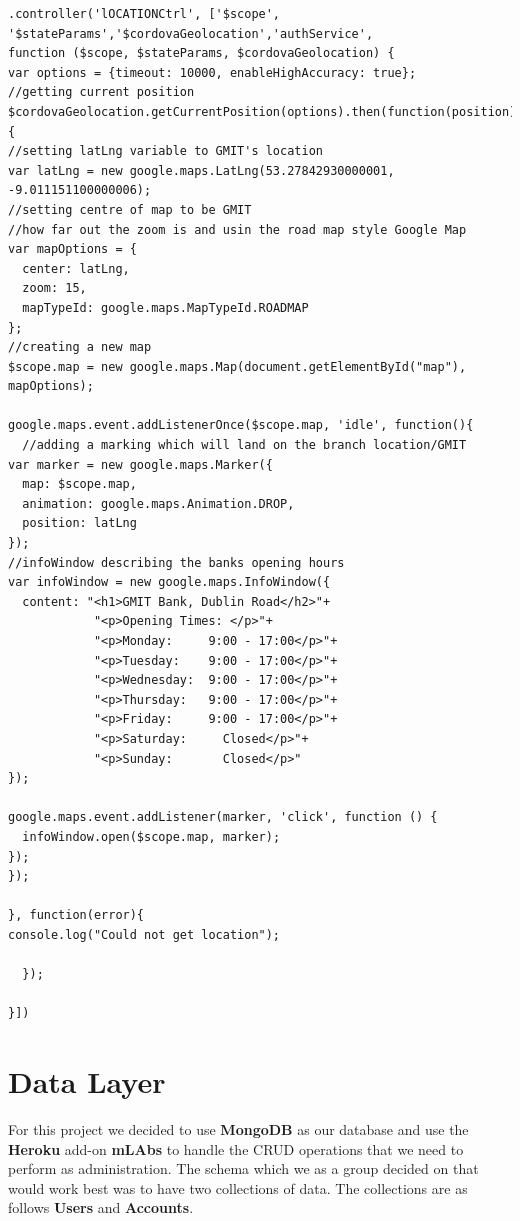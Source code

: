 \begin{verbatim}
.controller('lOCATIONCtrl', ['$scope',
'$stateParams','$cordovaGeolocation','authService',
function ($scope, $stateParams, $cordovaGeolocation) {
var options = {timeout: 10000, enableHighAccuracy: true};
//getting current position
$cordovaGeolocation.getCurrentPosition(options).then(function(position){
//setting latLng variable to GMIT's location
var latLng = new google.maps.LatLng(53.27842930000001, -9.011151100000006);
//setting centre of map to be GMIT
//how far out the zoom is and usin the road map style Google Map
var mapOptions = {
  center: latLng,
  zoom: 15,
  mapTypeId: google.maps.MapTypeId.ROADMAP
};
//creating a new map
$scope.map = new google.maps.Map(document.getElementById("map"), mapOptions);

google.maps.event.addListenerOnce($scope.map, 'idle', function(){
  //adding a marking which will land on the branch location/GMIT
var marker = new google.maps.Marker({
  map: $scope.map,
  animation: google.maps.Animation.DROP,
  position: latLng
});
//infoWindow describing the banks opening hours
var infoWindow = new google.maps.InfoWindow({
  content: "<h1>GMIT Bank, Dublin Road</h2>"+
            "<p>Opening Times: </p>"+
            "<p>Monday:     9:00 - 17:00</p>"+
            "<p>Tuesday:    9:00 - 17:00</p>"+
            "<p>Wednesday:  9:00 - 17:00</p>"+
            "<p>Thursday:   9:00 - 17:00</p>"+
            "<p>Friday:     9:00 - 17:00</p>"+
            "<p>Saturday:     Closed</p>"+
            "<p>Sunday:       Closed</p>"
});

google.maps.event.addListener(marker, 'click', function () {
  infoWindow.open($scope.map, marker);
});
});

}, function(error){
console.log("Could not get location");

  });

}])
\end{verbatim}

\section{Data Layer}
For this project we decided to use \textbf{MongoDB} as our database and use the \textbf{Heroku} add-on \textbf{mLAbs} to handle the CRUD operations that we need to perform as administration. The schema which we as a group decided on that would work best was to have two collections of data. The collections are as follows \textbf{Users} and \textbf{Accounts}.\paragraph{}

